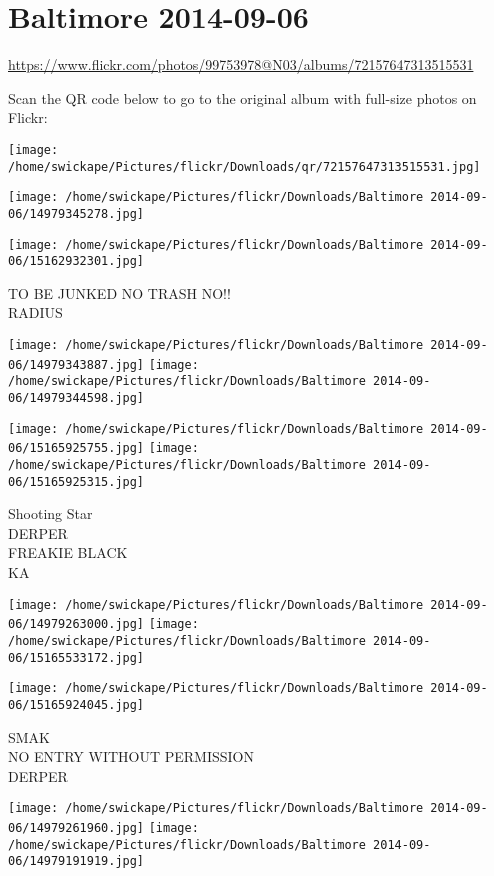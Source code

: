 \documentclass[10pt,letterpaper]{article}
\title{}
\author{}
\date{}
\begin{document}
\section*{Baltimore 2014-09-06}

\url{https://www.flickr.com/photos/99753978@N03/albums/72157647313515531}

Scan the QR code below to go to the original album with full-size photos on Flickr:

\texttt{[image: /home/swickape/Pictures/flickr/Downloads/qr/72157647313515531.jpg]}
\pagebreak

\texttt{[image: /home/swickape/Pictures/flickr/Downloads/Baltimore 2014-09-06/14979345278.jpg]}

\vspace{0.25in}
\texttt{[image: /home/swickape/Pictures/flickr/Downloads/Baltimore 2014-09-06/15162932301.jpg]}

TO BE JUNKED NO TRASH NO!!\\
RADIUS
\pagebreak

\texttt{[image: /home/swickape/Pictures/flickr/Downloads/Baltimore 2014-09-06/14979343887.jpg]}
\texttt{[image: /home/swickape/Pictures/flickr/Downloads/Baltimore 2014-09-06/14979344598.jpg]}

\texttt{[image: /home/swickape/Pictures/flickr/Downloads/Baltimore 2014-09-06/15165925755.jpg]}
\texttt{[image: /home/swickape/Pictures/flickr/Downloads/Baltimore 2014-09-06/15165925315.jpg]}

Shooting Star\\
DERPER\\
FREAKIE BLACK\\
KA
\pagebreak

\texttt{[image: /home/swickape/Pictures/flickr/Downloads/Baltimore 2014-09-06/14979263000.jpg]}
\texttt{[image: /home/swickape/Pictures/flickr/Downloads/Baltimore 2014-09-06/15165533172.jpg]}

\vspace{0.25in}
\texttt{[image: /home/swickape/Pictures/flickr/Downloads/Baltimore 2014-09-06/15165924045.jpg]}

SMAK\\
NO ENTRY WITHOUT PERMISSION\\
DERPER
\pagebreak

\texttt{[image: /home/swickape/Pictures/flickr/Downloads/Baltimore 2014-09-06/14979261960.jpg]}
\texttt{[image: /home/swickape/Pictures/flickr/Downloads/Baltimore 2014-09-06/14979191919.jpg]}
\end{document}
